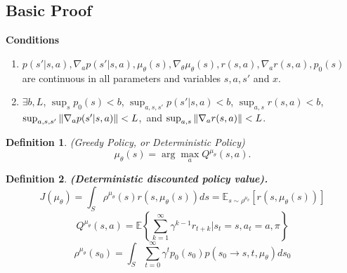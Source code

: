 \documentclass[a4paper]{article}
\newtheorem{definition}{Definition}
\begin{document}
\subsection{Basic Proof}%
\label{sub:basic_proof}

\textbf{Conditions}
\begin{enumerate}
    \item $ p(s' | s, a), \nabla_a p(s' | s, a), \mu_\theta (s), \nabla_\theta \mu_\theta(s), r(s, a), \nabla_a r(s,a), p_0(s)$ are continuous in all parameters and variables $ s, a, s'$ and $ x $.
    \item $ \exists b, L $, $ \sup_s p_0(s) < b $, $ \sup_{a, s, s'} p(s' | s,a) < b $, $ \sup_{a,s} r(s,a) < b $,
        $ \sup_{a,s,s'} \Arrowvert \nabla_a p(s'|s, a) \Arrowvert < L $,\ 
        and $ \sup_{a,s} \Arrowvert \nabla_a r(s,a) \Arrowvert < L $.
\end{enumerate}
\begin{definition}
    (Greedy Policy, or Deterministic Policy)
    \[
        \mu_\theta(s) = \arg\max_a Q^{\mu_\theta}(s, a).
    \]
\end{definition}
\begin{definition}
    \textbf{(Deterministic discounted policy value).}
    \[
        J(\mu_\theta) = \int_S \rho^{\mu_\theta}(s) r(s, \mu_\theta(s)) ds
        = \mathbb{E}_{s\sim\rho^{\mu_\theta}} [r(s, \mu_\theta(s))]
    \]
    \[
        Q^{\mu_\theta} (s, a)
        = \mathbb{E} \left\{ \sum^{\infty}_{k=1} \gamma^{k-1} r_{t+k} | s_t = s, a_t = a, \pi \right\}
    \]
    \[
        \rho ^{\mu_\theta}(s_0) = \int_S \sum^{\infty}_{t=0} \gamma^t p_0(s_0) p(s_0 \rightarrow s, t, \mu_\theta) d s_0
    \]
    
    
\end{definition}
\end{document}
